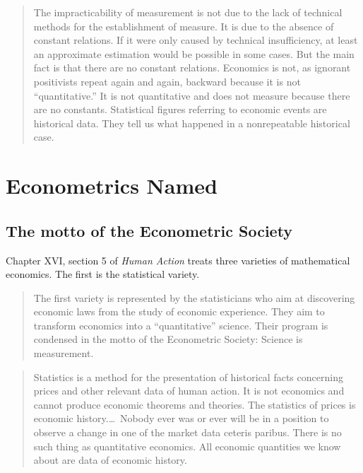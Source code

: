 \documentclass[12pt]{article}
\begin{document}
\begin{quote}
The impracticability of measurement is not due to the lack of technical methods
for the establishment of measure.  It is due to the absence of constant
relations.  If it were only caused by technical insufficiency, at least an
approximate estimation would be possible in some cases.  But the main fact is
that there are no constant relations.  Economics is not, as ignorant positivists
repeat again and again, backward because it is not ``quantitative.''  It is not
quantitative and does not measure because there are no constants.  Statistical
figures referring to economic events are historical data.  They tell us what
happened in a nonrepeatable historical case.
\hfill \citep[p.~56]{Mises1998HumanAction}
\end{quote}

\section{Econometrics Named}
\label{sec:econometrics}

\subsection{The motto of the Econometric Society}

Chapter XVI, section 5 of \emph{Human Action} treats three varieties of
mathematical economics.  The first is the statistical variety.

\begin{quote}
The first variety is represented by the statisticians who aim at discovering
economic laws from the study of economic experience.  They aim to transform
economics into a ``quantitative'' science.  Their program is condensed in the
motto of the Econometric Society: Science is measurement.
\hfill \citep[p.~347]{Mises1998HumanAction}
\end{quote}

\begin{quote}
Statistics is a method for the presentation of historical facts concerning
prices and other relevant data of human action.  It is not economics and cannot
produce economic theorems and theories.  The statistics of prices is economic
history.\ldots\ Nobody ever was or ever will be in a position to observe a
change in one of the market data ceteris paribus.  There is no such thing as
quantitative economics.  All economic quantities we know about are data of
economic history.
\hfill \citep[pp.~347--348]{Mises1998HumanAction}
\end{quote}
\end{document}
